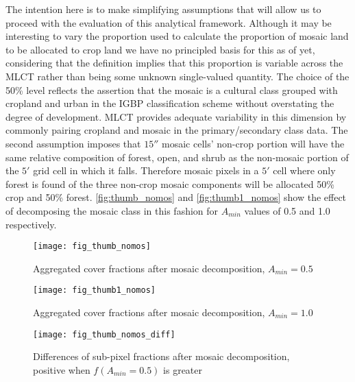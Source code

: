 The intention here is to make simplifying assumptions that will allow
us to proceed with the evaluation of this analytical framework.
Although it may be interesting to vary the proportion used to
calculate the proportion of mosaic land to be allocated to crop land
we have no principled basis for this as of yet, considering that the
definition implies that this proportion is variable across the MLCT
rather than being some unknown single-valued quantity.  The choice of
the 50\% level reflects the assertion that the mosaic is a cultural
class grouped with cropland and urban in the IGBP classification
scheme without overstating the degree of development.  MLCT provides
adequate variability in this dimension by commonly pairing cropland
and mosaic in the primary/secondary class data.  The second assumption
imposes that $15''$ mosaic cells' non-crop portion will have the same
relative composition of forest, open, and shrub as the non-mosaic
portion of the $5'$ grid cell in which it falls. Therefore mosaic
pixels in a $5'$ cell where only forest is found of the three non-crop
mosaic components will be allocated 50\% crop and 50\% forest.
\autoref{fig:thumb_nomos} and \autoref{fig:thumb1_nomos} show the
effect of decomposing the mosaic class in this fashion for $A_{min}$
values of 0.5 and 1.0 respectively.



\begin{figure}[hpt]
\centering
  


\texttt{[image: fig\_thumb\_nomos]}
 
\caption{Aggregated cover fractions after mosaic decomposition, $A_{min}=0.5$}
\label{fig:thumb_nomos}
\end{figure} 

\begin{figure}[hpt]
\centering
  


\texttt{[image: fig\_thumb1\_nomos]}
 
\caption{Aggregated cover fractions after mosaic decomposition, $A_{min}=1.0$}
\label{fig:thumb1_nomos}
\end{figure} 



\begin{figure}[hpt]
\centering
  

\texttt{[image: fig\_thumb\_nomos\_diff]}
 
\caption{Differences of sub-pixel fractions after mosaic
  decomposition, positive when $f(A_{min} = 0.5)$ is greater}
\label{fig:thumb_nomos_diff}
\end{figure} 





